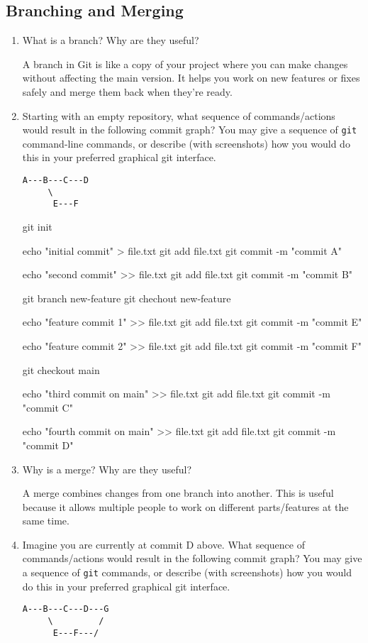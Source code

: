 \documentclass[10pt,twocolumn]{article}
\begin{document}
\subsection{Branching and Merging}

\begin{enumerate}
\item What is a branch? Why are they useful?

A branch in Git is like a copy of your project where you can make changes without affecting the main version. It helps you work on new features or fixes safely and merge them back when they’re ready.



\item Starting with an empty repository, what sequence of commands/actions would result in the following commit graph? You may give a sequence of \texttt{git} command-line commands, or describe (with screenshots) how you would do this in your preferred graphical git interface.
\begin{verbatim}
A---B---C---D
     \
      E---F
\end{verbatim}

git init

echo "initial commit" > file.txt
git add file.txt
git commit -m "commit A"

echo "second commit" >> file.txt
git add file.txt
git commit -m "commit B"

git branch new-feature
git chechout new-feature

echo "feature commit 1" >> file.txt
git add file.txt
git commit -m "commit E"

echo "feature commit 2" >> file.txt
git add file.txt
git commit -m "commit F"

git checkout main

echo "third commit on main" >> file.txt
git add file.txt
git commit -m "commit C"

echo "fourth commit on main" >> file.txt
git add file.txt
git commit -m "commit D"


\item Why is a merge? Why are they useful?

A merge combines changes from one branch into another. This is useful because it allows multiple people to work on different parts/features at the same time.

\item Imagine you are currently at commit D above. What sequence of commands/actions would result in the following commit graph? You may give a sequence of \texttt{git} commands, or describe (with screenshots) how you would do this in your preferred graphical git interface.
\begin{verbatim}
A---B---C---D---G
     \         /
      E---F---/
\end{verbatim}


\end{enumerate}
\end{document}
